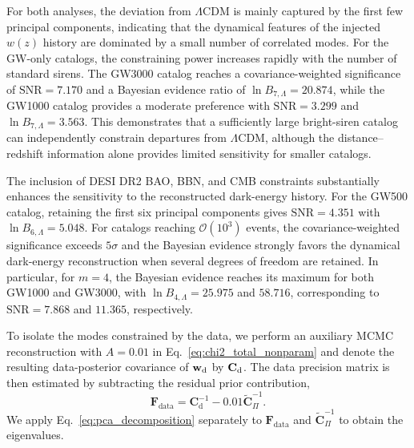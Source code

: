 \documentclass[
  aps,
  prd,
  twocolumn,
  nofootinbib,
  superscriptaddress,
  floatfix,
  longbibliography
]{revtex4-2}
\newcommand{\LCDM}{\ensuremath{\Lambda\mathrm{CDM}}}
\begin{document}
For both analyses, the deviation from $\LCDM$ is mainly captured by the
first few principal components, indicating that the dynamical features of
the injected $w(z)$ history are dominated by a small number of correlated
modes. For the GW-only catalogs, the constraining power increases rapidly
with the number of standard sirens. The GW3000 catalog reaches a
covariance-weighted significance of $\mathrm{SNR}=7.170$ and a Bayesian
evidence ratio of $\ln B_{7,\Lambda}=20.874$, while the GW1000 catalog
provides a moderate preference with $\mathrm{SNR}=3.299$ and
$\ln B_{7,\Lambda}=3.563$. This demonstrates that a sufficiently large
bright-siren catalog can independently constrain departures from
$\LCDM$, although the distance--redshift information alone provides
limited sensitivity for smaller catalogs.

The inclusion of DESI DR2 BAO, BBN, and CMB constraints substantially
enhances the sensitivity to the reconstructed dark-energy history. For the
GW500 catalog, retaining the first six principal components gives
$\mathrm{SNR}=4.351$ with $\ln B_{6,\Lambda}=5.048$. For catalogs reaching
$\mathcal{O}(10^3)$ events, the covariance-weighted significance exceeds
$5\sigma$ and the Bayesian evidence strongly favors the dynamical
dark-energy reconstruction when several degrees of freedom are retained.
In particular, for $m=4$, the Bayesian evidence reaches its maximum for
both GW1000 and GW3000, with $\ln B_{4,\Lambda}=25.975$ and $58.716$,
corresponding to $\mathrm{SNR}=7.868$ and $11.365$, respectively.





To isolate the modes constrained by the data, we perform an auxiliary MCMC
reconstruction with $A=0.01$ in Eq.~\eqref{eq:chi2_total_nonparam} and
denote the resulting data-posterior covariance of $\mathbf{w}_{\rm d}$ by
$\mathbf{C}_{\rm d}$. The data precision matrix is then estimated by
subtracting the residual prior contribution,
\begin{equation}
 \mathbf{F}_{\mathrm{data}}
 =\mathbf{C}_{\mathrm{d}}^{-1}
 -0.01\widetilde{\mathbf{C}}_{\Pi}^{-1}.
 \label{eq:data_fisher}
\end{equation}
We apply Eq.~\eqref{eq:pca_decomposition} separately to
$\mathbf{F}_{\mathrm{data}}$ and $\widetilde{\mathbf{C}}_{\Pi}^{-1}$ to obtain the
eigenvalues.
\end{document}
